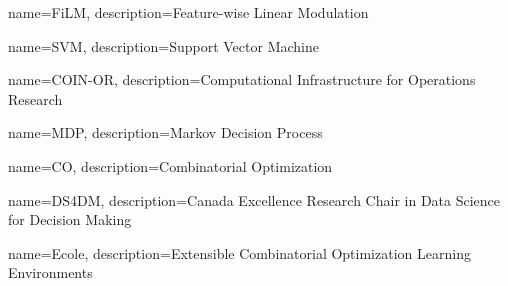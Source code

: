 {
        name=FiLM,
        description={Feature-wise Linear Modulation}
}

{
        name=SVM,
        description={Support Vector Machine}
}

{
        name=COIN-OR,
        description={Computational Infrastructure for Operations Research}
}

{
        name=MDP,
        description={Markov Decision Process}
}

{
        name=CO,
        description={Combinatorial Optimization}
}

{
        name=DS4DM,
        description={Canada Excellence Research Chair in Data Science for Decision Making}
}

{
        name=Ecole,
        description={Extensible Combinatorial Optimization Learning Environments}
}



